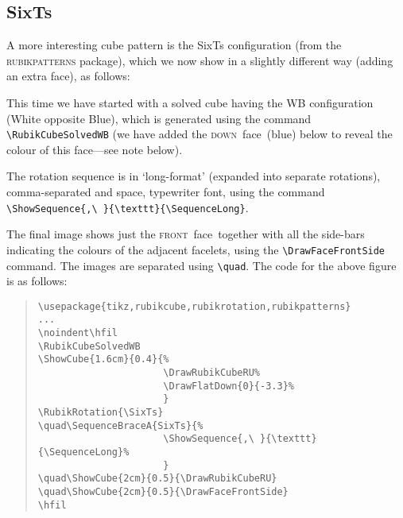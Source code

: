 \documentclass[a4paper]{article}
\newcommand{\downface}{\textsc{down}\ face}
\newcommand{\frontface}{\textsc{front}\ face}
\begin{document}
\pagebreak 

\subsection{SixTs}

A  more interesting cube pattern  is the SixTs configuration (from the 
\textsc{rubikpatterns} package),  which we  now show in a slightly 
different way (adding an extra face), as follows:

\bigskip

\noindent\hfil%
\RubikCubeSolvedWB%
%
\RubikRotation{\sixts}
\quad{}
\quad{}%
\quad{}%
\hfil

\bigskip

This time we have started with a solved cube having the WB  configuration 
(White opposite Blue), which is generated  using the command  
\verb!\RubikCubeSolvedWB! 
(we have added the \downface\ (blue) below to reveal the colour of this 
face---see note below). 

The rotation  sequence is   in `long-format' (expanded into 
separate rotations), comma-separated and space,  typewriter font,  
using the command \verb!\ShowSequence{,\ }{\texttt}{\SequenceLong}!.

The final image shows just the \frontface\  together with all the 
side-bars indicating the colours of the  adjacent facelets, 
using the \verb!\DrawFaceFrontSide! command. The images are 
separated using \verb!\quad!.
The code for the above figure is as follows:

\begin{quote}
\begin{verbatim}
\usepackage{tikz,rubikcube,rubikrotation,rubikpatterns}
...
\noindent\hfil
\RubikCubeSolvedWB
\ShowCube{1.6cm}{0.4}{%
                      \DrawRubikCubeRU%
                      \DrawFlatDown{0}{-3.3}%
                      }
\RubikRotation{\SixTs}
\quad\SequenceBraceA{SixTs}{%
                      \ShowSequence{,\ }{\texttt}{\SequenceLong}%
                      }
\quad\ShowCube{2cm}{0.5}{\DrawRubikCubeRU}
\quad\ShowCube{2cm}{0.5}{\DrawFaceFrontSide}
\hfil
\end{verbatim} 
\end{quote}
\end{document}

